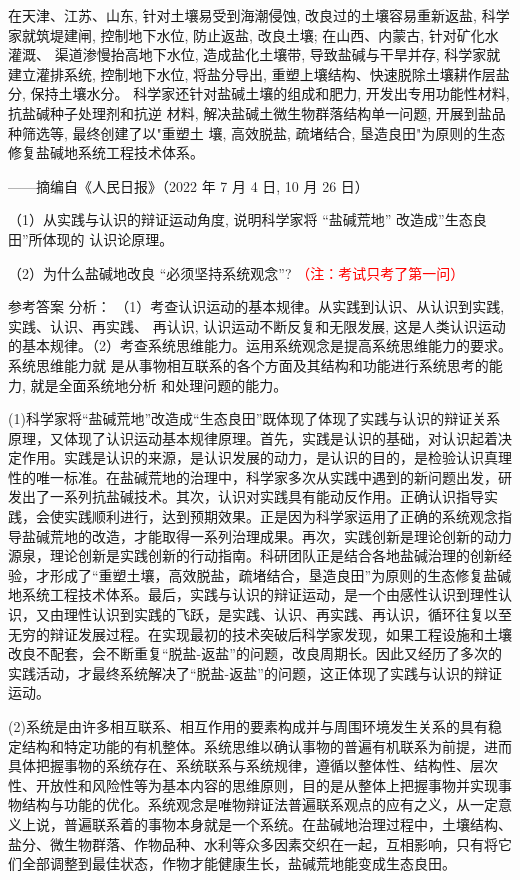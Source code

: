 \documentclass[a4paper,12pt]{article}
\begin{document}
在天津、江苏、山东, 针对土壤易受到海潮侵蚀, 改良过的土壤容易重新返盐, 科学 家就筑堤建闸, 控制地下水位, 防止返盐, 改良土壤; 在山西、内蒙古, 针对矿化水灌溉、 渠道渗慢抬高地下水位, 造成盐化土壤带, 导致盐碱与干旱并存, 科学家就建立灌排系统,  控制地下水位, 将盐分导出, 重塑上壤结构、快速脱除土壤耕作层盐分, 保持土壤水分。 科学家还针对盐碱土壤的组成和肥力, 开发出专用功能性材料, 抗盐碱种子处理剂和抗逆 材料, 解决盐碱土微生物群落结构单一问题, 开展到盐品种筛选等, 最终创建了以"重塑土 壤, 高效脱盐, 疏堵结合, 垦造良田"为原则的生态修复盐碱地系统工程技术体系。

——摘编自《人民日报》（2022 年 7 月 4 日, 10 月 26 日）

（1）从实践与认识的辩证运动角度, 说明科学家将 “盐碱荒地” 改造成”生态良田”所体现的 认识论原理。

（2）为什么盐碱地改良 “必须坚持系统观念”?  \textcolor{red}{（注：考试只考了第一问）}

\begin{mainbox}{参考答案}
分析：    （1）考查认识运动的基本规律。从实践到认识、从认识到实践, 实践、认识、再实践、 再认识, 认识运动不断反复和无限发展, 这是人类认识运动的基本规律。（2）考查系统思维能力。运用系统观念是提高系统思维能力的要求。系统思维能力就 是从事物相互联系的各个方面及其结构和功能进行系统思考的能力, 就是全面系统地分析 和处理问题的能力。

 (1)科学家将“盐碱荒地”改造成“生态良田”既体现了体现了实践与认识的辩证关系原理，又体现了认识运动基本规律原理。首先，实践是认识的基础，对认识起着决定作用。实践是认识的来源，是认识发展的动力，是认识的目的，是检验认识真理性的唯一标准。在盐碱荒地的治理中，科学家多次从实践中遇到的新问题出发，研发出了一系列抗盐碱技术。其次，认识对实践具有能动反作用。正确认识指导实践，会使实践顺利进行，达到预期效果。正是因为科学家运用了正确的系统观念指导盐碱荒地的改造，才能取得一系列治理成果。再次，实践创新是理论创新的动力源泉，理论创新是实践创新的行动指南。科研团队正是结合各地盐碱治理的创新经验，才形成了“重塑土壤，高效脱盐，疏堵结合，垦造良田”为原则的生态修复盐碱地系统工程技术体系。最后，实践与认识的辩证运动，是一个由感性认识到理性认识，又由理性认识到实践的飞跃，是实践、认识、再实践、再认识，循环往复以至无穷的辩证发展过程。在实现最初的技术突破后科学家发现，如果工程设施和土壤改良不配套，会不断重复“脱盐-返盐”的问题，改良周期长。因此又经历了多次的实践活动，才最终系统解决了“脱盐-返盐”的问题，这正体现了实践与认识的辩证运动。
 
    (2)系统是由许多相互联系、相互作用的要素构成并与周围环境发生关系的具有稳定结构和特定功能的有机整体。系统思维以确认事物的普遍有机联系为前提，进而具体把握事物的系统存在、系统联系与系统规律，遵循以整体性、结构性、层次性、开放性和风险性等为基本内容的思维原则，目的是从整体上把握事物并实现事物结构与功能的优化。系统观念是唯物辩证法普遍联系观点的应有之义，从一定意义上说，普遍联系着的事物本身就是一个系统。在盐碱地治理过程中，土壤结构、盐分、微生物群落、作物品种、水利等众多因素交织在一起，互相影响，只有将它们全部调整到最佳状态，作物才能健康生长，盐碱荒地能变成生态良田。
\end{mainbox}
\end{document}
